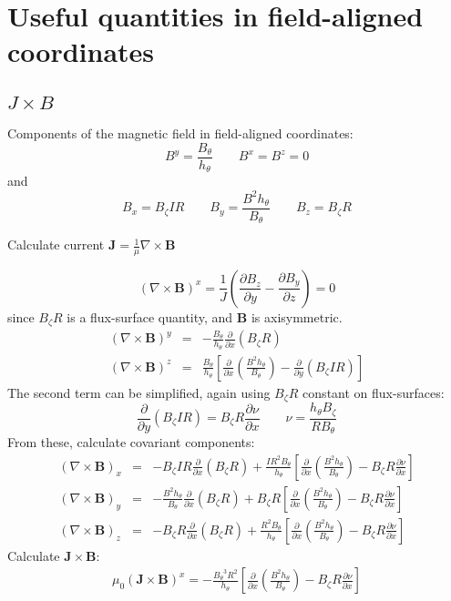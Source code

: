 \documentclass[12pt]{article}
\newcommand{\deriv}[2]{\ensuremath{\frac{\partial #1}{\partial #2}}}
\newcommand{\hthe}{\ensuremath{h_\theta}}
\newcommand{\Bp}{\ensuremath{B_\theta}}
\newcommand{\Bt}{\ensuremath{B_\zeta}}
\newcommand{\Vec}[1]{\ensuremath{\mathbf{#1}}}
\newcommand{\Bvec}{\Vec{B}}
\newcommand{\Jvec}{\Vec{J}}
\newcommand{\Curl}[1]{\ensuremath{\nabla\times #1 }}
\begin{document}
\section{Useful quantities in field-aligned coordinates}
\subsection{$J\times B$}

Components of the magnetic field in field-aligned coordinates:
\[
B^y = \frac{\Bp}{\hthe} \qquad B^x = B^z = 0
\]
and
\[
B_x = \Bt I R \qquad B_y = \frac{B^2\hthe}{\Bp} \qquad B_z = \Bt R
\]

Calculate current $\Jvec = \frac{1}{\mu}\Curl{\Bvec}$

\[
\left(\Curl{\Bvec}\right)^x = \frac{1}{J}\left(\deriv{B_z}{y} - \deriv{B_y}{z}\right) = 0
\]
since $\Bt R$ is a flux-surface quantity, and $\Bvec$ is axisymmetric.
\begin{eqnarray*}
\left(\Curl{\Bvec}\right)^y &=& -\frac{\Bp}{\hthe}\deriv{}{x}\left(\Bt R\right) \\
\left(\Curl{\Bvec}\right)^z &=& \frac{\Bp}{\hthe}\left[\deriv{}{x}\left(\frac{B^2\hthe}{\Bp}\right) - \deriv{}{y}\left(\Bt I R\right)\right]
\end{eqnarray*}
The second term can be simplified, again using $\Bt R$ constant on flux-surfaces:
\[
\deriv{}{y}\left(\Bt I R\right) = \Bt R\deriv{\nu}{x} \qquad \nu = \frac{\hthe\Bt}{R\Bp}
\]
From these, calculate covariant components:
\begin{eqnarray}
\left(\Curl{\Bvec}\right)_x &=& -\Bt I R \deriv{}{x}\left(\Bt R\right) + \frac{IR^2\Bp}{\hthe}\left[\deriv{}{x}\left(\frac{B^2\hthe}{\Bp}\right) - \Bt R\deriv{\nu}{x}\right] \nonumber\\
\left(\Curl{\Bvec}\right)_y &=& -\frac{B^2\hthe}{\Bp}\deriv{}{x}\left(\Bt R\right) + \Bt R\left[\deriv{}{x}\left(\frac{B^2\hthe}{\Bp}\right) - \Bt R\deriv{\nu}{x}\right] \label{eq:curlb_y}\\
\left(\Curl{\Bvec}\right)_z &=& -\Bt R\deriv{}{x}\left(\Bt R\right) + \frac{R^2\Bp}{\hthe}\left[\deriv{}{x}\left(\frac{B^2\hthe}{\Bp}\right) - \Bt R\deriv{\nu}{x}\right] \nonumber
\end{eqnarray}
Calculate $\Jvec\times\Bvec$:
\begin{eqnarray*}
\mu_0 \left(\Jvec\times\Bvec\right)^x = -\frac{\Bp^3 R^2}{\hthe}\left[\deriv{}{x}\left(\frac{B^2\hthe}{\Bp}\right) - \Bt R\deriv{\nu}{x}\right]
\end{eqnarray*}
\end{document}
